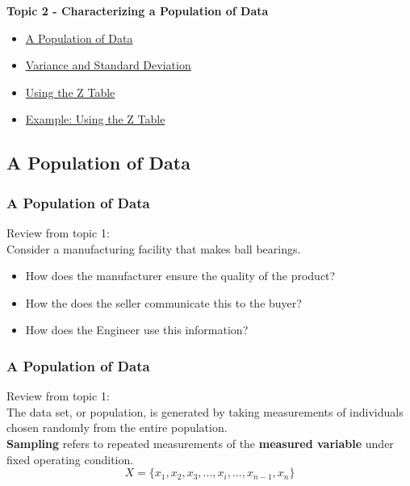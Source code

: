 \documentclass[fleqn]{ltx-talk} %
\newcommand{\sectionIItitle}{Characterizing a Population of Data}
\newcommand{\sectionIIsubsectionItitle}{A Population of Data}
\newcommand{\sectionIIsubsectionIItitle}{Variance and Standard Deviation}
\newcommand{\sectionIIsubsectionIIItitle}{Using the Z Table}
\newcommand{\sectionIIsubsectionIVtitle}{Example: Using the Z Table}
\begin{document}
		\begin{frame}
			\large \textbf{Topic 2 - \sectionIItitle} \vspace{3mm}\\

			\begin{itemize}
				\item \hyperref[sectionIIsubsectionI]{\sectionIIsubsectionItitle} \vspc %
				\item \hyperref[sectionIIsubsectionII]{\sectionIIsubsectionIItitle} \vspc %
				\item \hyperref[sectionIIsubsectionIII]{\sectionIIsubsectionIIItitle} \vspc %
				\item \hyperref[sectionIIsubsectionIV]{\sectionIIsubsectionIVtitle} \vspc %
			\end{itemize}

		\end{frame}

		\subsection{\sectionIIsubsectionItitle}\label{sectionIIsubsectionI}

			\begin{frame}
				\frametitle{\sectionIIsubsectionItitle}

        Review from topic 1:\vspace{2mm}\\
				
        Consider a manufacturing facility that makes ball bearings. 
				\begin{itemize}		
					\item How does the manufacturer ensure the quality of the product?
					\item How the does the seller communicate this to the buyer?
					\item How does the Engineer use this information? 
				\end{itemize}

			\end{frame}

			\begin{frame}
				\frametitle{\sectionIIsubsectionItitle}
        Review from topic 1:\vspace{2mm}\\
				
The data set, or population, is generated by taking measurements of individuals chosen randomly from the entire population. \\ 
		 
				 {\bfseries \RD Sampling} refers to repeated measurements of the {\bfseries \PR measured variable} under fixed operating condition.	\\
				 
				 \[ X = \{ x_1,x_2,x_3, ... , x_i , ... , x_{n-1}, x_{n} \}  \]
			\end{frame}
		
\end{document}
